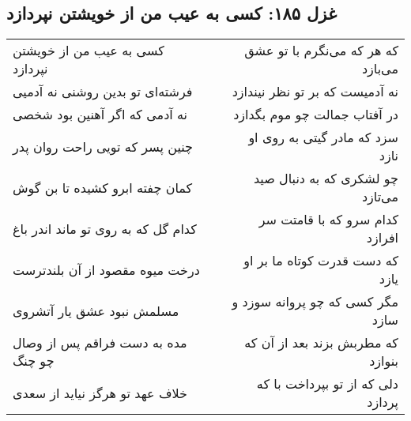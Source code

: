 \begin{center}
\section*{غزل ۱۸۵: کسی به عیب من از خویشتن نپردازد}
\label{sec:185}
\begin{longtable}{l p{0.5cm} r}
کسی به عیب من از خویشتن نپردازد
&&
که هر که می‌نگرم با تو عشق می‌بازد
\\
فرشته‌ای تو بدین روشنی نه آدمیی
&&
نه آدمیست که بر تو نظر نیندازد
\\
نه آدمی که اگر آهنین بود شخصی
&&
در آفتاب جمالت چو موم بگدازد
\\
چنین پسر که تویی راحت روان پدر
&&
سزد که مادر گیتی به روی او نازد
\\
کمان چفته ابرو کشیده تا بن گوش
&&
چو لشکری که به دنبال صید می‌تازد
\\
کدام گل که به روی تو ماند اندر باغ
&&
کدام سرو که با قامتت سر افرازد
\\
درخت میوه مقصود از آن بلندترست
&&
که دست قدرت کوتاه ما بر او یازد
\\
مسلمش نبود عشق یار آتشروی
&&
مگر کسی که چو پروانه سوزد و سازد
\\
مده به دست فراقم پس از وصال چو چنگ
&&
که مطربش بزند بعد از آن که بنوازد
\\
خلاف عهد تو هرگز نیاید از سعدی
&&
دلی که از تو بپرداخت با که پردازد
\\
\end{longtable}
\end{center}
